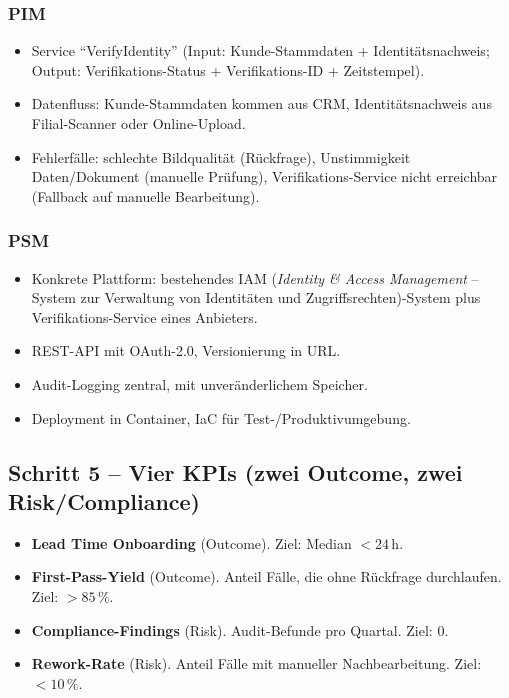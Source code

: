 \documentclass[11pt,a4paper,oneside]{article}
\newcommand{\fachbegriff}[1]{\textbf{#1}}
\begin{document}
\subsubsection{PIM}

\begin{itemize}
  \item Service ``VerifyIdentity'' (Input: Kunde-Stammdaten + Identitätsnachweis; Output: Verifikations-Status + Verifikations-ID + Zeitstempel).
  \item Datenfluss: Kunde-Stammdaten kommen aus CRM, Identitätsnachweis aus Filial-Scanner oder Online-Upload.
  \item Fehlerfälle: schlechte Bildqualität (Rückfrage), Unstimmigkeit Daten/Dokument (manuelle Prüfung), Verifikations-Service nicht erreichbar (Fallback auf manuelle Bearbeitung).
\end{itemize}

\subsubsection{PSM}

\begin{itemize}
  \item Konkrete Plattform: bestehendes IAM (\emph{Identity \& Access Management} -- System zur Verwaltung von Identitäten und Zugriffsrechten)-System plus Verifikations-Service eines Anbieters.
  \item REST-API mit OAuth-2.0, Versionierung in URL.
  \item Audit-Logging zentral, mit unveränderlichem Speicher.
  \item Deployment in Container, IaC für Test-/Produktivumgebung.
\end{itemize}

\subsection{Schritt 5 -- Vier KPIs (zwei Outcome, zwei Risk/Compliance)}

\begin{itemize}
  \item \fachbegriff{Lead Time Onboarding} (Outcome). Ziel: Median $<24\,\text{h}$.
  \item \fachbegriff{First-Pass-Yield} (Outcome). Anteil Fälle, die ohne Rückfrage durchlaufen. Ziel: $>85\,\%$.
  \item \fachbegriff{Compliance-Findings} (Risk). Audit-Befunde pro Quartal. Ziel: 0.
  \item \fachbegriff{Rework-Rate} (Risk). Anteil Fälle mit manueller Nachbearbeitung. Ziel: $<10\,\%$.
\end{itemize}
\end{document}
